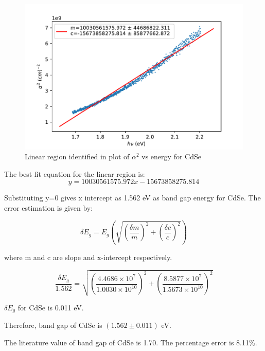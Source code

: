 \documentclass[a4paper, amsfonts, amssymb, amsmath, reprint, showkeys, nofootinbib, twoside]{revtex4-1}
\begin{document}
\begin{figure}[H]
	\centering
	\includegraphics[scale=0.6]{csef}
	\caption{Linear region identified in plot of $\alpha^2$ vs energy for CdSe}
	\label{8}
\end{figure}

The best fit equation for the linear region is:
\begin{equation}
	y=10030561575.972 x  -15673858275.814
\end{equation}

Substituting y=0 gives x intercept as 1.562 eV as band gap energy for CdSe. The error estimation is given by:

\begin{equation}
	\delta E_g=E_g\left( \sqrt{\left(\frac{ \delta m}{m}\right)^2+\left(\frac{ \delta c}{c}\right)^2 }\right) 
\end{equation}

where m and c are slope and x-intercept respectively.

\begin{equation}
	\frac{\delta E_g}{1.562}= \sqrt{\left(\frac{4.4686\times10^7}{1.0030\times10^{10}}\right)^2+\left(\frac{8.5877\times10^{7}}{1.5673\times10^{10}}\right)^2 }
\end{equation}

$\delta E_g$ for CdSe is 0.011 eV. 

Therefore, band gap of CdSe is $(1.562\pm0.011)$ eV.

The literature value of band gap of CdSe is 1.70. The percentage error is 8.11\%.
\end{document}
